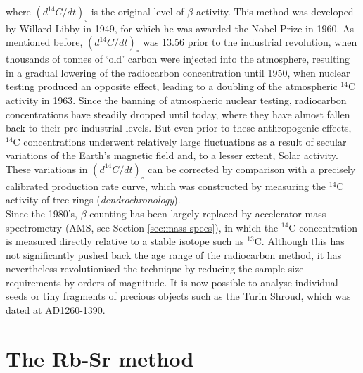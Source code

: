 where $(d^{14}C/dt)_\circ$ is the original level of $\beta$ activity.
This method was developed by Willard Libby in 1949, for which he was
awarded the Nobel Prize in 1960. As mentioned before,
$(d^{14}C/dt)_\circ$ was 13.56 prior to the industrial revolution,
when thousands of tonnes of `old' carbon were injected into the
atmosphere, resulting in a gradual lowering of the radiocarbon
concentration until 1950, when nuclear testing produced an opposite
effect, leading to a doubling of the atmospheric $^{14}$C activity in
1963. Since the banning of atmospheric nuclear testing, radiocarbon
concentrations have steadily dropped until today, where they have
almost fallen back to their pre-industrial levels. But even prior to
these anthropogenic effects, $^{14}$C concentrations underwent
relatively large fluctuations as a result of secular variations of the
Earth's magnetic field and, to a lesser extent, Solar activity. These
variations in $(d^{14}C/dt)_\circ$ can be corrected by comparison with
a precisely calibrated production rate curve, which was constructed by
measuring the $^{14}$C activity of tree rings
(\emph{dendrochronology}).\\

Since the 1980's, $\beta$-counting has been largely replaced by
accelerator mass spectrometry (AMS, see Section \ref{sec:mass-specs}),
in which the $^{14}$C concentration is measured directly relative to a
stable isotope such as $^{13}$C. Although this has not significantly
pushed back the age range of the radiocarbon method, it has
nevertheless revolutionised the technique by reducing the sample size
requirements by orders of magnitude. It is now possible to analyse
individual seeds or tiny fragments of precious objects such as the
Turin Shroud, which was dated at AD1260-1390.

\section{The Rb-Sr method}
\label{sec:Rb-Sr}

